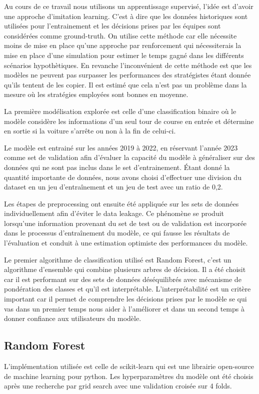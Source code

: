 Au cours de ce travail nous utilisons un apprentissage supervisé, l'idée est d'avoir une approche d'imitation learning.
C'est à dire que les données historiques sont utilisées pour l'entrainement et les décisions prises par les équipes sont considérées comme ground-truth.
On utilise cette méthode car elle nécessite moins de mise en place qu'une approche par renforcement qui nécessiterais la mise en place d'une simulation
pour estimer le temps gagné dans les différents scénarios hypothètiques.
En revanche l'inconvénient de cette méthode est que les modèles ne peuvent pas surpasser les performances des stratégistes étant donnée qu'ils tentent de les copier.
Il est estimé que cela n'est pas un problème dans la mesure où les stratégies employées sont bonnes en moyenne.

La première modélisation explorée est celle d'une classification binaire
où le modèle considère les informations d'un seul tour de course en entrée et détermine en sortie si la voiture s'arrête ou non à la fin de celui-ci.

Le modèle est entrainé sur les années 2019 à 2022, en réservant l'année 2023 comme set de validation afin d'évaluer la capacité du modèle à généraliser
sur des données qui ne sont pas inclus dans le set d'entrainement.
Étant donné la quantité importante de données, nous avons choisi d'effectuer une division du dataset en un jeu d'entraînement et un jeu de test avec un ratio de 0,2.

Les étapes de preprocessing ont ensuite été appliquée sur les sets de données individuellement afin d'éviter le data leakage.
Ce phénomène se produit lorsqu'une information provenant du set de test ou de validation est incorporée dans le processus d'entraînement du modèle,
ce qui fausse les résultats de l'évaluation et conduit à une estimation optimiste des performances du modèle.

Le premier algorithme de classification utilisé est Random Forest, c'est un algorithme d'ensemble qui combine plusieurs arbres de décision.
Il a été choisit car il est performant sur des sets de données déséquilibrés avec mécanisme de pondération des classes et qu'il est interprétable.
L'interprétabilité est un critère important car il permet de comprendre les décisions prises par le modèle se qui vas dans un premier temps nous aider à l'améliorer
et dans un second temps à donner confiance aux utilisateurs du modèle.

\subsection{Random Forest}
L'implémentation utilisée est celle de scikit-learn \cite{scikitLearnRandomForest} qui est une librairie open-source de machine learning pour python.
Les hyperparamètres du modèle ont été choisis après une recherche par grid search avec une validation croisée sur 4 folds.

